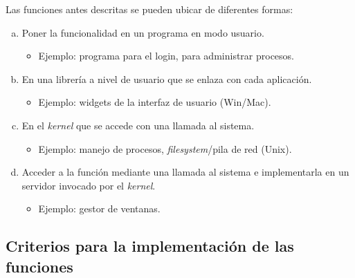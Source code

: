 \documentclass[a4paper,10pt,spanish]{article}
\begin{document}
Las funciones antes descritas se pueden ubicar de diferentes formas:

\begin{enumerate}[a.]
\item Poner la funcionalidad en un programa en modo usuario.

	\begin{itemize}
	\item Ejemplo: programa para el login, para administrar procesos.
	\end{itemize}
	
\item En una librería a nivel de usuario que se enlaza con cada aplicación.

	\begin{itemize}
	\item Ejemplo: widgets de la interfaz de usuario (Win/Mac).
	\end{itemize}

\item En el \textit{kernel} que se accede con una llamada al sistema.

	\begin{itemize}
	\item Ejemplo: manejo de procesos, \textit{filesystem}/pila de red (Unix).
	\end{itemize}

\item Acceder a la función mediante una llamada al sistema e implementarla en un servidor invocado por el \textit{kernel}.

	\begin{itemize}
	\item Ejemplo: gestor de ventanas.
	\end{itemize}

\end{enumerate}

\subsection{Criterios para la implementación de las funciones}
\end{document}
